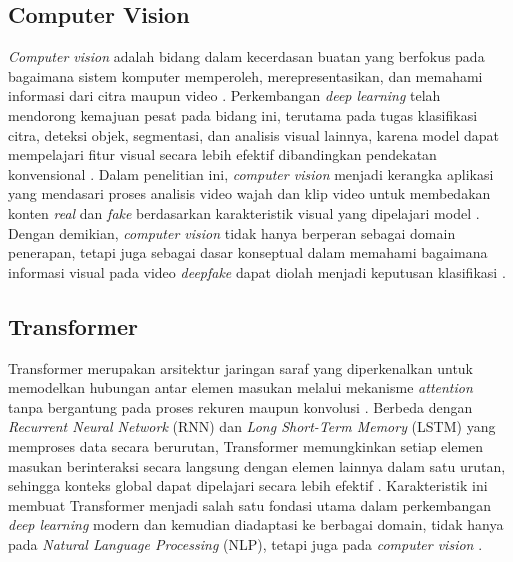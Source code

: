 \subsection{Computer Vision} \label{II.Teori3}
\textit{Computer vision} adalah bidang dalam kecerdasan buatan yang berfokus pada bagaimana sistem komputer memperoleh, merepresentasikan, dan memahami informasi dari citra maupun video \cite{Voulodimos2018}. Perkembangan \textit{deep learning} telah mendorong kemajuan pesat pada bidang ini, terutama pada tugas klasifikasi citra, deteksi objek, segmentasi, dan analisis visual lainnya, karena model dapat mempelajari fitur visual secara lebih efektif dibandingkan pendekatan konvensional \cite{Voulodimos2018}. Dalam penelitian ini, \textit{computer vision} menjadi kerangka aplikasi yang mendasari proses analisis video wajah dan klip video untuk membedakan konten \textit{real} dan \textit{fake} berdasarkan karakteristik visual yang dipelajari model \cite{Voulodimos2018}. Dengan demikian, \textit{computer vision} tidak hanya berperan sebagai domain penerapan, tetapi juga sebagai dasar konseptual dalam memahami bagaimana informasi visual pada video \textit{deepfake} dapat diolah menjadi keputusan klasifikasi \cite{Voulodimos2018}. \par

\subsection{Transformer} \label{II.Teori4}
Transformer merupakan arsitektur jaringan saraf yang diperkenalkan untuk memodelkan hubungan antar elemen masukan melalui mekanisme \textit{attention} tanpa bergantung pada proses rekuren maupun konvolusi \cite{vaswani2023attentionneed}. Berbeda dengan \textit{Recurrent Neural Network} (RNN) dan \textit{Long Short-Term Memory} (LSTM) yang memproses data secara berurutan, Transformer memungkinkan setiap elemen masukan berinteraksi secara langsung dengan elemen lainnya dalam satu urutan, sehingga konteks global dapat dipelajari secara lebih efektif \cite{vaswani2023attentionneed}. Karakteristik ini membuat Transformer menjadi salah satu fondasi utama dalam perkembangan \textit{deep learning} modern dan kemudian diadaptasi ke berbagai domain, tidak hanya pada \textit{Natural Language Processing} (NLP), tetapi juga pada \textit{computer vision} \cite{vaswani2023attentionneed}. \par

